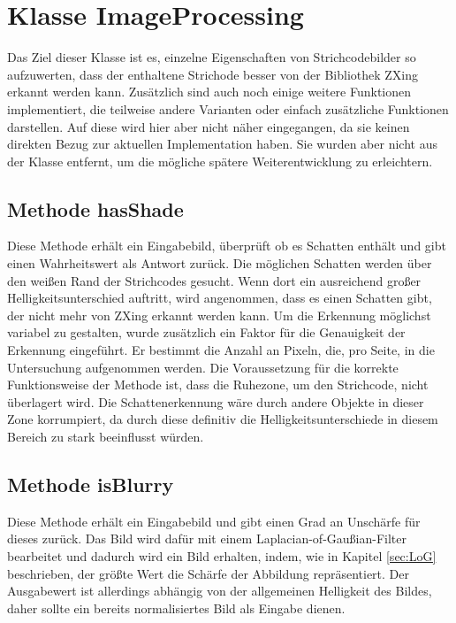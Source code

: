 \section{Klasse ImageProcessing}
\writtenby{\dcauthornameriren}%
Das Ziel dieser Klasse ist es, einzelne Eigenschaften von Strichcodebilder so aufzuwerten, dass der enthaltene Strichode besser von der Bibliothek ZXing erkannt werden kann.
Zusätzlich sind auch noch einige weitere Funktionen implementiert, die teilweise andere Varianten oder einfach zusätzliche Funktionen darstellen. Auf diese wird hier aber nicht näher eingegangen, da sie keinen direkten Bezug zur aktuellen Implementation haben. Sie wurden aber nicht aus der Klasse entfernt, um die mögliche spätere Weiterentwicklung zu erleichtern.


\subsection*{Methode hasShade}
Diese Methode erhält ein Eingabebild, überprüft ob es Schatten enthält und gibt einen Wahrheitswert als Antwort zurück.
Die möglichen Schatten werden über den weißen Rand der Strichcodes gesucht. Wenn dort ein ausreichend großer Helligkeitsunterschied auftritt, wird angenommen, dass es einen Schatten gibt, der nicht mehr von ZXing erkannt werden kann.
Um die Erkennung möglichst variabel zu gestalten, wurde zusätzlich ein Faktor für die Genauigkeit der Erkennung eingeführt. Er bestimmt die Anzahl an Pixeln, die, pro Seite, in die Untersuchung aufgenommen werden.
Die Voraussetzung für die korrekte Funktionsweise der Methode ist, dass die Ruhezone, um den Strichcode, nicht überlagert wird. Die Schattenerkennung wäre durch andere Objekte in dieser Zone korrumpiert, da durch diese definitiv die Helligkeitsunterschiede in diesem Bereich zu stark beeinflusst würden.


\subsection*{Methode isBlurry}
Diese Methode erhält ein Eingabebild und gibt einen Grad an Unschärfe für dieses zurück.
Das Bild wird dafür mit einem Laplacian-of-Gaußian-Filter bearbeitet und dadurch wird ein Bild erhalten, indem, wie in Kapitel \ref*{sec:LoG} beschrieben, der größte Wert die Schärfe der Abbildung repräsentiert.
Der Ausgabewert ist allerdings abhängig von der allgemeinen Helligkeit des Bildes, daher sollte ein bereits normalisiertes Bild als Eingabe dienen.


